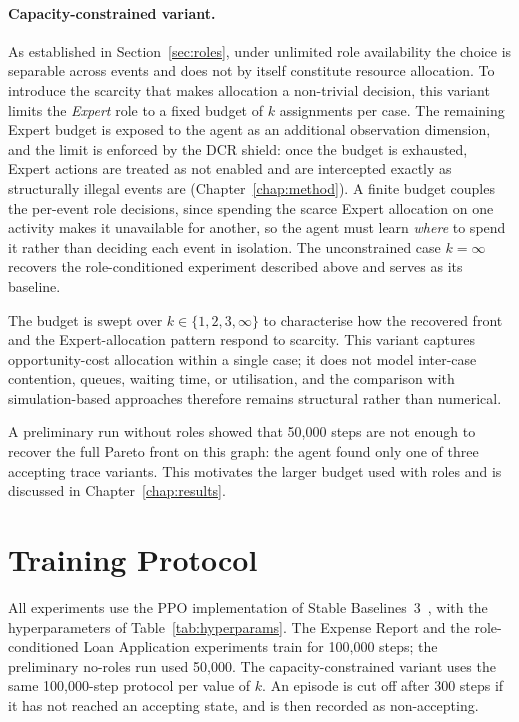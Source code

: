 \paragraph{Capacity-constrained variant.}
As established in Section~\ref{sec:roles}, under unlimited role
availability the choice is separable across events and does not by
itself constitute resource allocation. To introduce the scarcity that
makes allocation a non-trivial decision, this variant limits the
\emph{Expert} role to a fixed budget of $k$ assignments per case. The
remaining Expert budget is exposed to the agent as an additional
observation dimension, and the limit is enforced by the \ac{DCR}
shield: once the budget is exhausted, Expert actions are treated as
not enabled and are intercepted exactly as structurally illegal
events are (Chapter~\ref{chap:method}). A finite budget couples the
per-event role decisions, since spending the scarce Expert allocation
on one activity makes it unavailable for another, so the agent must
learn \emph{where} to spend it rather than deciding each event in
isolation. The unconstrained case $k=\infty$ recovers the
role-conditioned experiment described above and serves as its
baseline.


The budget is swept over $k \in \{1, 2, 3, \infty\}$
to characterise how the recovered front and the Expert-allocation
pattern respond to scarcity. This variant captures opportunity-cost
allocation within a single case; it does not model inter-case
contention, queues, waiting time, or utilisation, and the comparison
with simulation-based approaches therefore remains structural rather
than numerical.

\begin{remark}
A preliminary run without roles showed that 50{,}000 steps are not
enough to recover the full Pareto front on this graph: the agent found
only one of three accepting trace variants. This motivates the larger
budget used with roles and is discussed in
Chapter~\ref{chap:results}.
\end{remark}

\section{Training Protocol}
\label{sec:training_protocol}

All experiments use the \ac{PPO} implementation of Stable
Baselines~3~\cite{Raffin2021Stable-Baselines3:Implementations}, with the hyperparameters of
Table~\ref{tab:hyperparams}. The Expense Report and the role-conditioned
Loan Application experiments train for 100{,}000 steps; the preliminary
no-roles run used 50{,}000. The capacity-constrained variant uses the
same 100{,}000-step protocol per value of $k$. An episode is cut off
after 300 steps if it has not reached an accepting state, and is then
recorded as non-accepting.

